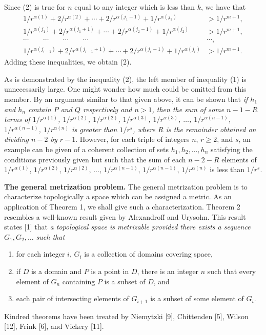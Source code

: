 \documentclass[11pt,a4paper,leqno,twoside]{article}
\newcommand{\heading}[1]{\par\medskip\noindent\textbf{#1}\enspace}
\begin{document}
Since (2) is true for $n$ equal to any integer which is less than $k$, we have that
\begin{equation}\tag{3}
\begin{aligned}
1/r^{\alpha(1)}+2/r^{\alpha(2)}+\cdots+2/r^{\alpha(j_1-1)}+1/r^{\alpha(j_1)}&>1/r^{m+1},\\
1/r^{\alpha(j_1)}+2/r^{\alpha(j_1+1)}+\cdots+2/r^{\alpha(j_2-1)}+1/r^{\alpha(j_2)}&>1/r^{m+1},\\
\cdots\qquad\cdots\qquad\cdots\qquad\cdots\qquad&\cdots,\\
1/r^{\alpha(j_{r-1})}+2/r^{\alpha(j_{r-1}+1)}+\cdots+2/r^{\alpha(j_r-1)}+1/r^{\alpha(j_r)}&>1/r^{m+1}.
\end{aligned}
\end{equation}
Adding these inequalities, we obtain (2).

As is demonstrated by the inequality (2), the left member of inequality (1) is unnecessarily large. One might wonder how much could be omitted from this member. By an argument similar to that given above, it can be shown that \textit{if $h_1$ and $h_n$ contain $P$ and $Q$ respectively and $n>1$, then the sum of some $n-1-R$ terms of $1/r^{\alpha(1)}$, $1/r^{\alpha(2)}$, $1/r^{\alpha(2)}$, $1/r^{\alpha(3)}$, $1/r^{\alpha(3)}$, $\ldots$, $1/r^{\alpha(n-1)}$, $1/r^{\alpha(n-1)}$, $1/r^{\alpha(n)}$ is greater than $1/r^s$, where $R$ is the remainder obtained on dividing $n-2$ by $r-1$}. However, for each triple of integers $n$, $r\geq2$, and $s$, an example
\newpage %
\noindent can be given of a coherent collection of sets $h_1,h_2,\ldots,h_n$ satisfying the conditions previously given but such that the sum of each $n-2-R$ elements of $1/r^{\alpha(1)}$, $1/r^{\alpha(2)}$, $1/r^{\alpha(2)}$, $\ldots$, $1/r^{\alpha(n-1)}$, $1/r^{\alpha(n-1)}$, $1/r^{\alpha(n)}$ is less than $1/r^s$.

\heading{The general metrization problem.} The general metrization problem is to characterize topologically a space which can be assigned a metric. As an application of Theorem 1, we shall give such a characterization. Theorem 2 resembles a well-known result given by Alexandroff and Urysohn. This result states [1] that \textit{a topological space is metrizable provided there exists a sequence $G_1,G_2,\ldots$ such that}
\begin{enumerate}[label=(\alph*),nosep,leftmargin=2.5em]\itshape
\item for each integer $i$, $G_i$ is a collection of domains covering space,
\item if $D$ is a domain and $P$ is a point in $D$, there is an integer $n$ such that every element of $G_n$ containing $P$ is a subset of $D$, and
\item each pair of intersecting elements of $G_{i+1}$ is a subset of some element of $G_i$.
\end{enumerate}
Kindred theorems have been treated by Niemytzki [9], Chittenden [5], Wilson [12], Frink [6], and Vickery [11].
\end{document}
